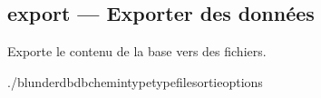 \documentclass[letterpaper,10pt,french]{sphinxmanual}
\begin{document}
\subsection{export — Exporter des données}
\label{\detokenize{cli:export-exporter-des-donnees}}
\sphinxAtStartPar
Exporte le contenu de la base vers des fichiers.

\begin{sphinxVerbatim}[commandchars=\\\{\}]
./blunderdb\PYGZhy{}\PYGZhy{}db\PYGZlt{}chemin\PYGZgt{}\PYGZhy{}\PYGZhy{}type\PYGZlt{}type\PYGZgt{}\PYGZhy{}\PYGZhy{}file\PYGZlt{}sortie\PYGZgt{}\PYG{o}{[}options\PYG{o}{]}
\end{sphinxVerbatim}
\end{document}

